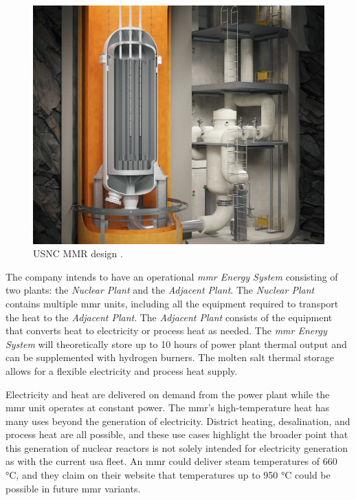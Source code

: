 \begin{figure}[H]
    \centering
    \includegraphics[scale=0.19]{images/reactor_design/wide-02.png}
    \caption{USNC MMR design \cite{usnc_design_2021}.}
    \label{fig:mmr_design}
\end{figure}

The company intends to have an operational \textit{\gls{mmr} Energy System} consisting of two plants: the \textit{Nuclear Plant} and the \textit{Adjacent Plant}. The \textit{Nuclear Plant} contains multiple \gls{mmr} units, including all the equipment required to transport the heat to the \textit{Adjacent Plant}. The \textit{Adjacent Plant} consists of the equipment that converts heat to electricity or process heat as needed. The \textit{\gls{mmr} Energy System} will theoretically store up to 10 hours of power plant thermal output and can be supplemented with hydrogen burners. The molten salt thermal storage allows for a flexible electricity and process heat supply.

Electricity and heat are delivered on demand from the power plant while the \gls{mmr} unit operates at constant power. The \gls{mmr}'s high-temperature heat has many uses beyond the generation of electricity. District heating, desalination, and process heat are all possible, and these use cases highlight the broader point that this generation of nuclear reactors is not solely intended for electricity generation as with the current \gls{usa} fleet. An \gls{mmr} could deliver steam temperatures of 660 °C, and they claim on their website that temperatures up to 950 °C could be possible in future \gls{mmr} variants.

